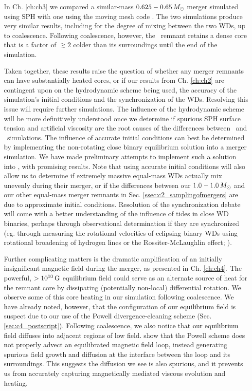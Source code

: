 In Ch. \ref{ch:ch3} we compared a similar-mass $0.625-0.65\,\Msun$ merger simulated using SPH with one using the moving mesh code \arepo.  The two simulations produce very similar results, including for the degree of mixing between the two WDs, up to coalescence.  Following coalescence, however, the \arepo\ remnant retains a dense core that is a factor of $\gtrsim2$ colder than its surroundings until the end of the simulation.


Taken together, these results raise the question of whether any merger remnants can have substantially heated cores, or if our results from Ch. \ref{ch:ch2} are contingent upon on the hydrodynamic scheme being used, the accuracy of the simulation's initial conditions and the synchronization of the WDs.  Resolving this issue will require further simulations.  The influence of the hydrodynamic scheme will be more definitively understood once we determine if spurious SPH surface tension and artificial viscosity are the root causes of the differences between \gasoline\ and \arepo\ simulations.  The influence of accurate initial conditions can best be determined by implementing the non-rotating close binary equilibrium solution \citep{uryue98} into a merger simulation.  We have made preliminary attempts to implement such a solution into \gasoline, with promising results.  Note that using accurate initial conditions will also allow us to determine if extremely massive equal-mass WDs actually mix unevenly during their merger, or if the differences between our $1.0 - 1.0\,\Msun$ and our other equal-mass merger remnants in Sec. \ref{ssec:c2_samplingofmergers} are due to approximate initial conditions.  Resolution of the synchronization debate will come with a better understanding of the influence of tides in close WD binaries, perhaps through observational determination if they are synchronized (eg. through measuring the rotational velocities of eclipsing binary WDs using rotational broadening of hydrogen lines or the Rossiter-McLaughlin effect; \citealt{piro11}).

Further complicating matters is the dramatic amplification of an initially insignificant magnetic field during the merger, as presented in Ch. \ref{ch:ch4}.  The powerful, $>10^{10}\,\mathrm{G}$ equilibrium field could serve as an alternate source of heat for the remnant core by dissipating (potentially non-local) differential rotation.  We observe some of this core heating in our simulation following coalescence.  We have already noted, however, that the configuration of our equilibrium field is suspect due to our use of the Powell divergence-cleaning scheme (Sec. \ref{sec:c4_postscript}).  Following coalescence, we also notice that our equilibrium field diffuses into adjacent regions of low field.  \cite{hopkr16} show that the Powell scheme does not properly advect an equilibrated magnetic field loop, instead generating spurious field growth and diffusion at the interface between the loop and its surroundings.  This suggests the diffusion we see is also spurious, and it prevents us from accurately capturing magnetically mediated viscous evolution and heating.

